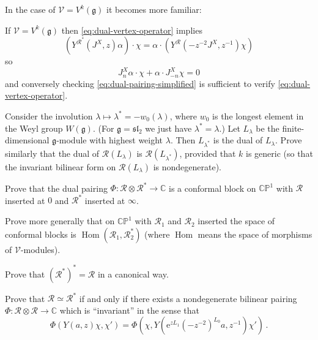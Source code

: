 \documentclass[12pt,letterpaper,reqno]{amsart}
\numberwithin{equation}{section}
\newcommand{\fg}{{\mathfrak g}}
\newcommand{\fsl}{{\mathfrak {sl}}}
\newcommand{\bbC}{\ensuremath{\mathbb C}}
\newcommand{\bbP}{\ensuremath{\mathbb P}}
\newcommand{\e}{{\mathrm e}}
\newcommand{\vertex}{\mathcal{V}}
\newcommand{\vrep}{\mathcal{R}}
\DeclareMathOperator{\Hom}{Hom}
\begin{document}
In the case of $\vertex = V^k(\fg)$ it becomes more familiar:
\begin{example}
If $\vertex = V^k(\fg)$ then \eqref{eq:dual-vertex-operator} implies
\begin{equation}
  (Y^{\vrep^*}(J^X,z) \alpha) \cdot \chi = \alpha \cdot (Y^\vrep(- z^{-2} J^X, z^{-1}) \chi)
\end{equation}
so
\begin{equation} \label{eq:dual-pairing-simplified}
  J^X_n \alpha \cdot \chi + \alpha \cdot J^X_{-n} \chi = 0
\end{equation}
and conversely checking \eqref{eq:dual-pairing-simplified} is
sufficient to verify \eqref{eq:dual-vertex-operator}.
\end{example}

\begin{exercise}
Consider the involution $\lambda \mapsto \lambda^* = -w_0(\lambda)$, where $w_0$ is the longest
element in the Weyl group $W(\fg)$. (For $\fg = \fsl_2$ we just have $\lambda^* = \lambda$.)
Let $L_\lambda$ be the finite-dimensional $\fg$-module with highest weight $\lambda$. Then $L_{\lambda^*}$
is the dual of $L_{\lambda}$. Prove similarly that the dual of $\vrep(L_\lambda)$ is $\vrep(L_{\lambda^*})$, provided that $k$ is generic
(so that the invariant bilinear form on $\vrep(L_\lambda)$ is 
nondegenerate).
\end{exercise}

\begin{exercise}
Prove that the dual pairing $\Phi: \vrep \otimes \vrep^* \to \bbC$ is a conformal block on $\bbC\bbP^1$ with $\vrep$ inserted at $0$ and $\vrep^*$ inserted at $\infty$.
\end{exercise}

\begin{exercise}
Prove more generally that on $\bbC\bbP^1$ with $\vrep_1$ and $\vrep_2$
inserted the space of conformal blocks is $\Hom(\vrep_1, \vrep_2^*)$
(where $\Hom$ means the space of morphisms of $\vertex$-modules).
\end{exercise}

\begin{exercise}
Prove that $(\vrep^*)^* = \vrep$ in a canonical way.
\end{exercise}

\begin{exercise}
Prove that $\vrep \simeq \vrep^*$ if and only if there exists
a nondegenerate bilinear pairing 
$\Phi: \vrep \otimes \vrep \to \bbC$ which is ``invariant'' in the 
sense that
\begin{equation}
  \Phi(Y(a,z) \chi, \chi') = \Phi(\chi, Y(\e^{z L_1} (-z^{-2})^{L_0} a, z^{-1}) \chi') \, .
\end{equation}
\end{exercise}
\end{document}
